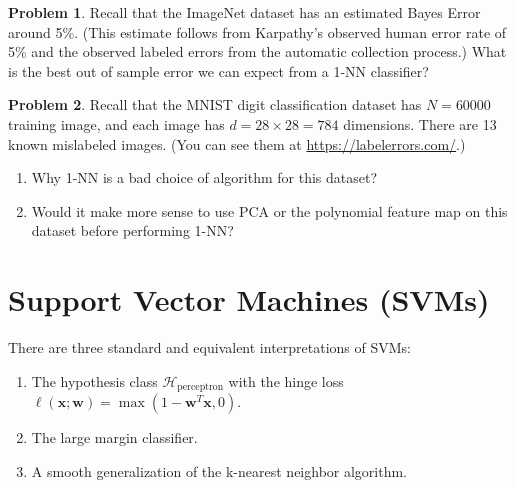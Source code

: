 \documentclass[10pt]{exam}
\theoremstyle{definition}
\newtheorem{problem}{Problem}
\newtheorem{note}{Note}
\newcommand{\trans}[1]{{#1}^{T}}
\newcommand{\loss}{\ell}
\newcommand{\w}{\mathbf w}
\newcommand{\x}{\mathbf x}
\newcommand{\HH}[1]{\mathcal H_{\text{#1}}}
\begin{document}
\newpage
\begin{problem}
    Recall that the ImageNet dataset has an estimated Bayes Error around 5\%.
    (This estimate follows from Karpathy's observed human error rate of 5\% and the observed labeled errors from the automatic collection process.)
    What is the best out of sample error we can expect from a 1-NN classifier?
\end{problem}

\vspace{3in}
\begin{problem}
    Recall that the MNIST digit classification dataset has $N=60000$ training image, and each image has $d=28\times28=784$ dimensions.
    There are 13 known mislabeled images.
    (You can see them at \url{https://labelerrors.com/}.)
    \begin{enumerate}
        \item Why 1-NN is a bad choice of algorithm for this dataset?
        \vspace{2in}
        \item Would it make more sense to use PCA or the polynomial feature map on this dataset before performing 1-NN?
    \end{enumerate}
\end{problem}

%

\newpage
\section*{Support Vector Machines (SVMs)}

There are three standard and equivalent interpretations of SVMs:
\begin{enumerate}
\item The hypothesis class $\HH{perceptron}$ with the hinge loss $\loss(\x;\w) = \max(1-\trans\w\x, 0)$.
\item The large margin classifier.
\item A smooth generalization of the k-nearest neighbor algorithm.
\end{enumerate}
\end{document}
